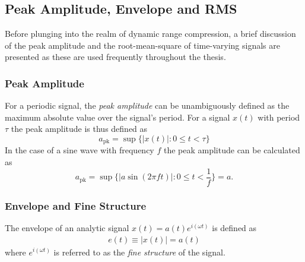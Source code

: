 \documentclass[../main2.tex]{subfiles}
\begin{document}
\subsection{Peak Amplitude, Envelope and RMS}
Before plunging into the realm of dynamic range compression, a brief discussion of
the peak amplitude and the root-mean-square of time-varying signals are presented as these are used frequently throughout the thesis.
\subsubsection{Peak Amplitude}
For a periodic signal, the \emph{peak amplitude} can be unambiguously defined as the maximum absolute value over the signal's period. For a signal $x(t)$ with period $\tau$ the peak amplitude is thus defined as
\begin{equation}
a_\text{pk} = \sup \{ |x(t)| :  0 \leq t < \tau \}
\end{equation}
In the case of a sine wave with frequency $f$ the peak amplitude can be calculated as
\begin{equation}\label{eq:sine_wave}
a_\text{pk} = \sup \{ |a \sin(2 \pi f t) | : 0 \leq t < \frac{1}{f} \} = a.
\end{equation}
\subsubsection{Envelope and Fine Structure}\label{theory_envelope}
The envelope of an analytic signal $x(t) = a(t)e^{i(\omega t)}$ is defined as \cite{bedrosian1962analytic}
\begin{align}
e(t) \equiv |x(t)| = a(t)
\end{align}
where $e^{i(\omega t)}$ is referred to as the \emph{fine structure} of the signal.
\end{document}
